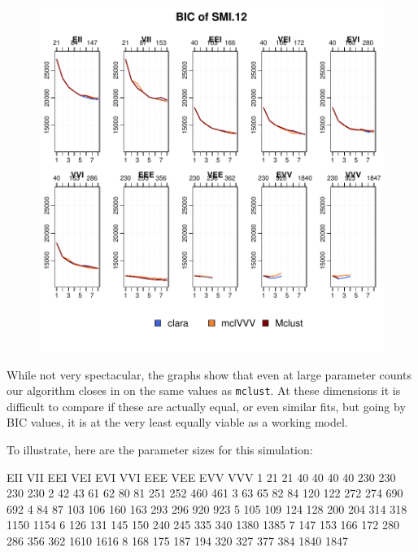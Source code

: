 \begin{figure}[h!]
    \centering
\includegraphics{chapter3-2smiplot}
\end{figure}

While not very spectacular, the graphs show that even at large parameter
counts our algorithm closes in on the same values as {\tt mclust}.
At these dimensions it is difficult to compare if these are actually 
equal, or even similar fits, but going by BIC values, it is at the very 
least equally viable as a working model.

To illustrate, here are the parameter sizes for this simulation:
\begin{Schunk}
\begin{Soutput}
  EII VII EEI VEI EVI VVI EEE VEE  EVV  VVV
1  21  21  40  40  40  40 230 230  230  230
2  42  43  61  62  80  81 251 252  460  461
3  63  65  82  84 120 122 272 274  690  692
4  84  87 103 106 160 163 293 296  920  923
5 105 109 124 128 200 204 314 318 1150 1154
6 126 131 145 150 240 245 335 340 1380 1385
7 147 153 166 172 280 286 356 362 1610 1616
8 168 175 187 194 320 327 377 384 1840 1847
\end{Soutput}
\end{Schunk}




